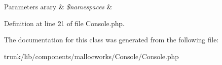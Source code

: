 \begin{DoxyParams}[1]{Parameters}
arary & {\em \$namespaces} & \\
\hline
\end{DoxyParams}


Definition at line 21 of file Console.php.



The documentation for this class was generated from the following file:\begin{DoxyCompactItemize}
\item 
trunk/lib/components/mallocworks/Console/Console.php\end{DoxyCompactItemize}
